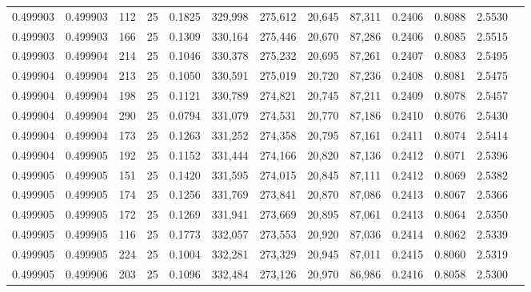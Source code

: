 \begin{tabular}{rrrrrrrrrrrrr}
0.499903 & 0.499903 &   112 &  25 &                                     0.1825 & 329,998 & 275,612 &  20,645 &  87,311 & 0.2406 & 0.8088 & 2.5530 \\
0.499903 & 0.499903 &   166 &  25 &                                     0.1309 & 330,164 & 275,446 &  20,670 &  87,286 & 0.2406 & 0.8085 & 2.5515 \\
0.499903 & 0.499904 &   214 &  25 &                                     0.1046 & 330,378 & 275,232 &  20,695 &  87,261 & 0.2407 & 0.8083 & 2.5495 \\
0.499904 & 0.499904 &   213 &  25 &                                     0.1050 & 330,591 & 275,019 &  20,720 &  87,236 & 0.2408 & 0.8081 & 2.5475 \\
0.499904 & 0.499904 &   198 &  25 &                                     0.1121 & 330,789 & 274,821 &  20,745 &  87,211 & 0.2409 & 0.8078 & 2.5457 \\
0.499904 & 0.499904 &   290 &  25 &                                     0.0794 & 331,079 & 274,531 &  20,770 &  87,186 & 0.2410 & 0.8076 & 2.5430 \\
0.499904 & 0.499904 &   173 &  25 &                                     0.1263 & 331,252 & 274,358 &  20,795 &  87,161 & 0.2411 & 0.8074 & 2.5414 \\
0.499904 & 0.499905 &   192 &  25 &                                     0.1152 & 331,444 & 274,166 &  20,820 &  87,136 & 0.2412 & 0.8071 & 2.5396 \\
0.499905 & 0.499905 &   151 &  25 &                                     0.1420 & 331,595 & 274,015 &  20,845 &  87,111 & 0.2412 & 0.8069 & 2.5382 \\
0.499905 & 0.499905 &   174 &  25 &                                     0.1256 & 331,769 & 273,841 &  20,870 &  87,086 & 0.2413 & 0.8067 & 2.5366 \\
0.499905 & 0.499905 &   172 &  25 &                                     0.1269 & 331,941 & 273,669 &  20,895 &  87,061 & 0.2413 & 0.8064 & 2.5350 \\
0.499905 & 0.499905 &   116 &  25 &                                     0.1773 & 332,057 & 273,553 &  20,920 &  87,036 & 0.2414 & 0.8062 & 2.5339 \\
0.499905 & 0.499905 &   224 &  25 &                                     0.1004 & 332,281 & 273,329 &  20,945 &  87,011 & 0.2415 & 0.8060 & 2.5319 \\
0.499905 & 0.499906 &   203 &  25 &                                     0.1096 & 332,484 & 273,126 &  20,970 &  86,986 & 0.2416 & 0.8058 & 2.5300 \\

\end{tabular}
